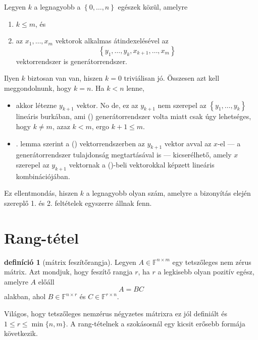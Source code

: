 \documentclass[9pt, a4paper, showtrims]{memoir}
\makeatletter
\let\Aref\relax
\renewenvironment{proof}[1][\proofname]
    {\par\pushQED{\qed}%
    \normalfont \topsep6\p@\@plus6\p@\relax
    \trivlist
    \item[\hskip\labelsep
        \itshape
    #1\@addpunct{:}]\ignorespaces}
    {\popQED\endtrivlist\@endpefalse}
\theoremstyle{plain}
\theoremstyle{remark}
\theoremstyle{definition}
\newtheorem{definition}[proposition]{definíció}
\makeatother
\begin{document}
\begin{proof}
    Legyen $k$ a legnagyobb a $\left\{ 0,\dots,n \right\}$ egészek közül, amelyre
    \begin{enumerate}
        \item $k\leq m$, és
        \item az $x_1,\dots,x_m$ vektorok alkalmas átindexelésével az
            \[
                \left\{ y_1,\dots,y_k,x_{k+1},\dots,x_m \right\}\tag{\dag}
            \]
            vektorrendszer is generátorrendszer.
    \end{enumerate}
    Ilyen $k$ biztosan van van, hiszen $k=0$ triviálisan jó.
    Összesen azt kell meggondolnunk, hogy $k=n$.
    Ha $k<n$ lenne, 
    \begin{itemize}
        \item 
            akkor létezne $y_{k+1}$ vektor.
            No de, ez az $y_{k+1}$ nem szerepel az $\left\{ y_1,\dots,y_k \right\}$ lineáris burkában,
            ami (\dag) generátorrendszer volta miatt csak úgy lehetséges, 
            hogy $k\neq m$, azaz $k<m$, ergo $k+1\leq m$.
        \item
            \Aref{le:gencsere}. lemma szerint a (\dag) vektorrendszerben az $y_{k+1}$ vektor 
            avval az $x$-el
            --- a generátorrendszer tulajdonság megtartásával is --- 
            kicserélhető, 
            amely $x$ szerepel az $y_{k+1}$ vektornak a (\dag)-beli
            vektorokkal képzett lineáris kombinációjában. 
    \end{itemize}
    Ez ellentmondás, hiszen $k$ a legnagyobb olyan szám, 
    amelyre a bizonyítás elején szereplő 1. és 2. feltételek egyszerre állnak fenn.
\end{proof}
\section{Rang-tétel}
\begin{definition}[mátrix feszítőrangja]
    Legyen $A\in\mathbb{F}^{n\times m}$ egy tetszőleges nem zérus mátrix.
    Azt mondjuk, hogy feszítő rangja $r$, ha $r$ a legkisebb olyan pozitív egész, amelyre $A$ előáll
    \[
        A=BC
    \]
    alakban, ahol $B\in\mathbb{F}^{n\times r}$ és $C\in\mathbb{F}^{r\times n}$.
\end{definition}
Világos, hogy tetszőleges nemzérus négyzetes mátrixra ez jól definiált és $1\leq r \leq \min\{n,m\}$.
A rang-tételnek a szokásosnál egy kicsit erősebb formája következik.
\end{document}
